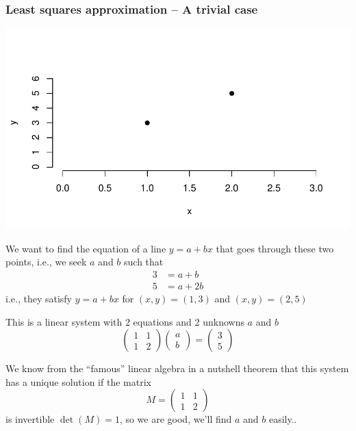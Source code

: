 \documentclass[aspectratio=169]{beamer}\usepackage[]{graphicx}\usepackage[]{xcolor}
\makeatletter
\def\maxwidth{ %
  \ifdim\Gin@nat@width>\linewidth
    \linewidth
  \else
    \Gin@nat@width
  \fi
}
\newenvironment{knitrout}{}{} %
\makeatother
\begin{document}
\begin{frame}[fragile]\frametitle{Least squares approximation -- A trivial case}
\begin{knitrout}
\color{fgcolor}
\includegraphics[width=\maxwidth]{FIGS/L05-plot-2-points-and-line-1} 
\end{knitrout}
\end{frame}

\begin{frame}
We want to find the equation of a line $y=a+bx$ that goes through these two points, i.e., we seek $a$ and $b$ such that
$$
\begin{aligned}
3 &= a+b \\
5 &= a+2b
\end{aligned}
$$
i.e., they satisfy $y=a+bx$ for $(x,y)=(1,3)$ and $(x,y)=(2,5)$
\end{frame}

\begin{frame}
This is a linear system with 2 equations and 2 unknowns $a$ and $b$
$$
\begin{pmatrix}
1 & 1 \\ 1 & 2
\end{pmatrix}
\begin{pmatrix}
a \\ b
\end{pmatrix}
=
\begin{pmatrix}
3 \\ 5
\end{pmatrix}
$$
\end{frame}

\begin{frame}[fragile]
We know from the ``famous'' linear algebra in a nutshell theorem that this system has a unique solution if the matrix
$$
M=
\begin{pmatrix}
1 & 1 \\ 1 & 2
\end{pmatrix}
$$
is invertible
\vfill
$\det(M)=1$, so we are good, we'll find $a$ and $b$ easily..
\end{frame}
\end{document}
